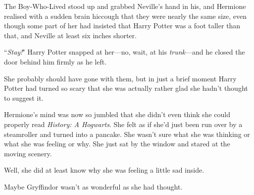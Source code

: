 The Boy-Who-Lived stood up and grabbed Neville's hand in his, and Hermione realised with a sudden brain hiccough that they were nearly the same size, even though some part of her had insisted that Harry Potter was a foot taller than that, and Neville at least six inches shorter.

``\emph{Stay!}" Harry Potter snapped at her—no, wait, at his \emph{trunk}—and he closed the door behind him firmly as he left.

She probably should have gone with them, but in just a brief moment Harry Potter had turned so scary that she was actually rather glad she hadn't thought to suggest it.

Hermione's mind was now so jumbled that she didn't even think she could properly read \emph{History: A Hogwarts}. She felt as if she'd just been run over by a steamroller and turned into a pancake. She wasn't sure what she was thinking or what she was feeling or why. She just sat by the window and stared at the moving scenery.

Well, she did at least know why she was feeling a little sad inside.

Maybe Gryffindor wasn't as wonderful as she had thought.


